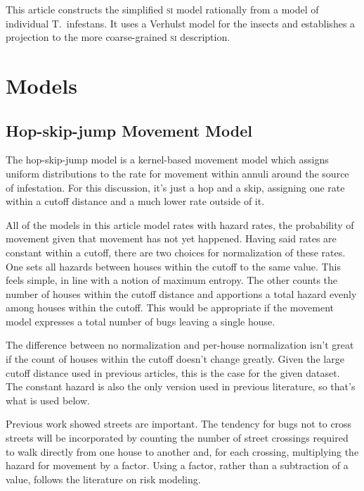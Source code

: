 \documentclass{article}
\begin{document}
This article constructs the simplified \textsc{si} model
rationally from a model of individual T.\ infestans. It uses
a Verhulst model for the insects and establishes a projection
to the more coarse-grained \textsc{si} description.


\section{Models}
\subsection{Hop-skip-jump Movement Model}
The hop-skip-jump model is a kernel-based movement model
which assigns uniform distributions to the rate for
movement within annuli around the source of infestation.
For this discussion, it's just a hop and a skip, assigning
one rate within a cutoff distance and a much lower rate outside
of it.

All of the models in this article model rates with hazard rates,
the probability of movement given that movement has not yet
happened. Having said rates are constant within a cutoff,
there are two choices for normalization of these rates.
One sets all hazards between houses within the cutoff to the
same value. This feels simple, in line with a notion of
maximum entropy.
The other counts the number of houses within
the cutoff distance and apportions a total hazard evenly
among houses within the cutoff. This would be appropriate
if the movement model expresses a total number of bugs leaving
a single house.

The difference between no normalization and per-house normalization
isn't great if the count of houses within the cutoff doesn't
change greatly. Given the large cutoff distance used in 
previous articles, this is the case for the given dataset.
The constant hazard is also the only version used in previous
literature, so that's what is used below.

Previous work showed streets are important. The tendency
for bugs not to cross streets will be incorporated by counting
the number of street crossings required to walk directly from
one house to another and, for each crossing, multiplying
the hazard for movement by a factor. Using a factor, rather
than a subtraction of a value, follows the literature on
risk modeling.
\end{document}
